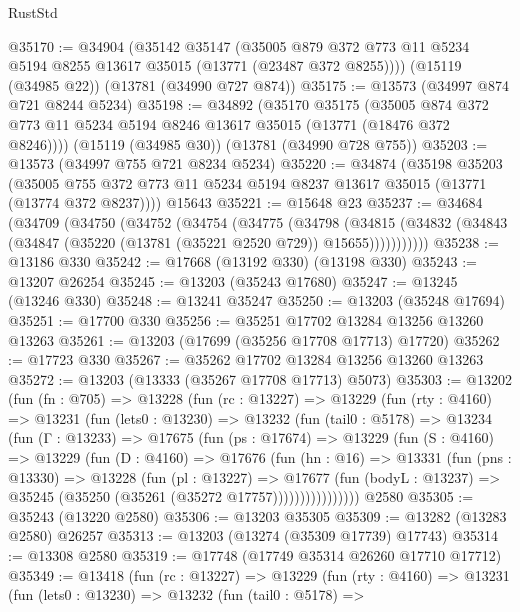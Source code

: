 \begin{lexlean}{RustStd}
\begin{coremodule}
@35170 := @34904
    (@35142
      @35147
      (@35005 @879 @372 @773 @11 @5234 @5194 @8255 @13617 @35015 (@13771 (@23487 @372 @8255))))
    (@15119 (@34985 @22))
    (@13781 (@34990 @727 @874))
@35175 := @13573 (@34997 @874 @721 @8244 @5234)
@35198 := @34892
    (@35170
      @35175
      (@35005 @874 @372 @773 @11 @5234 @5194 @8246 @13617 @35015 (@13771 (@18476 @372 @8246))))
    (@15119 (@34985 @30))
    (@13781 (@34990 @728 @755))
@35203 := @13573 (@34997 @755 @721 @8234 @5234)
@35220 := @34874
    (@35198
      @35203
      (@35005 @755 @372 @773 @11 @5234 @5194 @8237 @13617 @35015 (@13771 (@13774 @372 @8237))))
    @15643
@35221 := @15648 @23
@35237 := @34684
    (@34709
      (@34750
        (@34752
          (@34754
            (@34775
              (@34798
                (@34815
                  (@34832 (@34843 (@34847 (@35220 (@13781 (@35221 @2520 @729)) @15655)))))))))))
@35238 := @13186 @330
@35242 := @17668 (@13192 @330) (@13198 @330)
@35243 := @13207 @26254
@35245 := @13203 (@35243 @17680)
@35247 := @13245 (@13246 @330)
@35248 := @13241 @35247
@35250 := @13203 (@35248 @17694)
@35251 := @17700 @330
@35256 := @35251 @17702 @13284 @13256 @13260 @13263
@35261 := @13203 (@17699 (@35256 @17708 @17713) @17720)
@35262 := @17723 @330
@35267 := @35262 @17702 @13284 @13256 @13260 @13263
@35272 := @13203 (@13333 (@35267 @17708 @17713) @5073)
@35303 := @13202
    (fun (fn : @705) =>
    @13228
      (fun (rc : @13227) =>
      @13229
        (fun (rty : @4160) =>
        @13231
          (fun (lets0 : @13230) =>
          @13232
            (fun (tail0 : @5178) =>
            @13234
              (fun (Γ : @13233) =>
              @17675
                (fun (ps : @17674) =>
                @13229
                  (fun (S : @4160) =>
                  @13229
                    (fun (D : @4160) =>
                    @17676
                      (fun (hn : @16) =>
                      @13331
                        (fun (pns : @13330) =>
                        @13228
                          (fun (pl : @13227) =>
                          @17677
                            (fun (bodyL : @13237) =>
                            @35245 (@35250 (@35261 (@35272 @17757))))))))))))))))
    @2580
@35305 := @35243 (@13220 @2580)
@35306 := @13203 @35305
@35309 := @13282 (@13283 @2580) @26257
@35313 := @13203 (@13274 (@35309 @17739) @17743)
@35314 := @13308 @2580
@35319 := @17748 (@17749 @35314 @26260 @17710 @17712)
@35349 := @13418
    (fun (rc : @13227) =>
    @13229
      (fun (rty : @4160) =>
      @13231
        (fun (lets0 : @13230) =>
        @13232
          (fun (tail0 : @5178) =>

\end{coremodule}
\end{lexlean}
